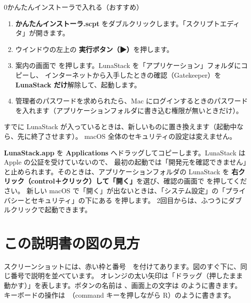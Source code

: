 \begin{step}{0}{かんたんインストーラで入れる（おすすめ）}
  \begin{enumerate}[itemsep=1pt, topsep=2pt]
    \item \textbf{かんたんインストーラ.scpt} をダブルクリックします。「スクリプトエディタ」が開きます。
    \item ウインドウの左上の \textbf{実行ボタン（▶）}を押します。
    \item 案内の画面で  を押します。LunaStack を「アプリケーション」フォルダにコピーし、
          インターネットから入手したときの確認（Gatekeeper）を \textbf{LunaStack だけ}解除して、起動します。
    \item 管理者のパスワードを求められたら、Mac にログインするときのパスワードを入れます（アプリケーションフォルダに書き込む権限が無いときだけ）。
  \end{enumerate}
  すでに LunaStack が入っているときは、新しいものに置き換えます（起動中なら、先に終了させます）。
  macOS 全体のセキュリティの設定は変えません。
\end{step}

\begin{tip}[自分でドラッグして入れるとき]
  \textbf{LunaStack.app} を \textbf{Applications} へドラッグしてコピーします。LunaStack は Apple の公証を受けていないので、
  最初の起動では「開発元を確認できません」と止められます。そのときは、アプリケーションフォルダの LunaStack を
  \textbf{右クリック（control＋クリック）して「開く」}を選び、確認の画面で  を押してください。
  新しい macOS で「開く」が出ないときは、「システム設定」の「プライバシーとセキュリティ」の下にある  を押します。
  2回目からは、ふつうにダブルクリックで起動できます。
\end{tip}

\section{この説明書の図の見方}

スクリーンショットには、赤い枠と番号 \,\, を付けてあります。図のすぐ下に、同じ番号で説明を並べています。
オレンジの太い矢印は「ドラッグ（押したまま動かす）」を表します。ボタンの名前は 、画面上の文字は  のように書きます。
キーボードの操作は \,（command キーを押しながら R）のように書きます。
